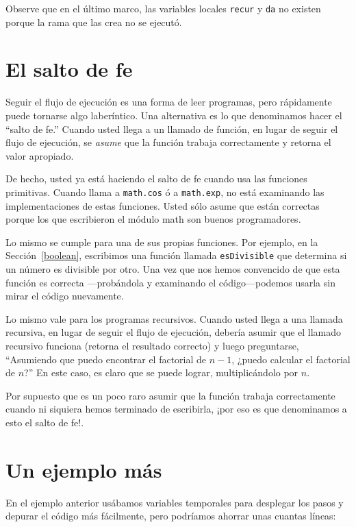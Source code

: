 Observe que en el último marco, las variables locales \texttt{recur} y \texttt{da} 
no existen porque la rama que las crea no se ejecutó.


\section{El salto de fe}

Seguir el flujo de ejecución es una forma de leer programas, pero
rápidamente puede tornarse algo laberíntico. Una alternativa es
lo que denominamos hacer el ``salto de fe.'' Cuando usted llega a un 
llamado de función, en lugar de seguir el flujo de ejecución, se
{\em asume} que la función trabaja correctamente y retorna el 
valor apropiado.

De hecho, usted ya está haciendo el salto de fe cuando usa
las funciones primitivas. Cuando llama a  \texttt{math.cos} ó a \texttt{math.exp},
no está examinando las implementaciones de estas funciones.
Usted sólo asume que están correctas porque los que escribieron el
módulo math son buenos programadores.

Lo mismo se cumple para una de sus propias funciones. Por ejemplo,
en la  Sección~\ref{boolean}, escribimos una función llamada \texttt{esDivisible}
que determina si un número es divisible por otro.  Una vez que
nos hemos convencido de que esta función es correcta ---probándola
y examinando el código---podemos usarla sin mirar el código nuevamente.


Lo mismo vale para los programas recursivos. Cuando usted llega a una
llamada recursiva, en lugar de seguir el flujo de ejecución, debería
asumir que el llamado recursivo funciona (retorna el resultado correcto)
y luego preguntarse, ``Asumiendo que puedo encontrar el factorial de $n-1$, 
¿puedo calcular el factorial de $n$?''  En este caso, es claro que
se puede lograr, multiplicándolo por $n$.

Por supuesto que es un poco raro asumir que la función trabaja correctamente
cuando ni siquiera hemos terminado de escribirla, ¡por eso es que denominamos
a esto el salto de fe!.


\section{Un ejemplo más}
\label{one more example}

En el ejemplo anterior usábamos variables  temporales para desplegar
los pasos y depurar el código más fácilmente, pero podríamos
ahorrar unas cuantas líneas:

